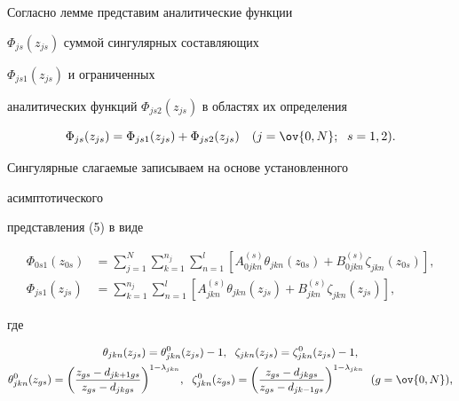  


Согласно лемме представим аналитические функции 


$\Phi_{js}(z_{js})$ суммой сингулярных составляющих 


$\Phi_{js1}(z_{js})$ и ограниченных 


аналитических функций $\Phi_{js2}(z_{js})$ в областях их определения 


\begin{equation} 


\Phi_{js}(z_{js})=\Phi_{js1}(z_{js})+\Phi_{js2}(z_{js}) 


\quad (j=\ov{0,N};\ \; s=1,2). 


\end{equation} 


Сингулярные слагаемые записываем на основе установленного 


асимптотического 


представления (5) в виде 


\begin{equation} 


\begin{split} 


\Phi_{0s1}(z_{0s})&=\sum^N_{j=1}\sum^{n_j}_{k=1} 


\sum^l_{n=1}[A^{(s)}_{0jkn}\theta_{jkn}(z_{0s})+ 


B^{(s)}_{0jkn}\zeta_{jkn}(z_{0s})],\\ 


\Phi_{js1}(z_{js})&=\sum^{n_j}_{k=1}\sum^l_{n=1} 


[A^{(s)}_{jkn}\theta_{jkn}(z_{js})+ 


B^{(s)}_{jkn}\zeta_{jkn}(z_{js})], 


\end{split} 


\end{equation} 


где 


\begin{gather*} 


\theta_{jkn}(z_{js})=\theta^0_{jkn}(z_{js})-1, 


\ \; \zeta_{jkn}(z_{js})=\zeta^0_{jkn}(z_{js})-1, \\


\theta^0_{jkn}(z_{gs})=\bigg( 


\frac{z_{gs}-d_{jk+1gs}}{z_{gs}-d_{jk gs}} 


\bigg)^{1-\lambda_{jkn}}, 


\ \; \zeta^0_{jkn}(z_{gs})=\bigg( 


\frac{z_{gs}-d_{jk gs}}{z_{gs}-d_{jk-1gs}} 


\bigg)^{1-\lambda_{jkn}}\ \; (g=\ov{0,N}), 


\end{gather*} 



